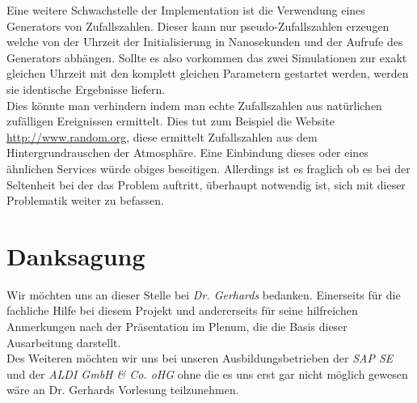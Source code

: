 \documentclass[10pt,twocolumn]{scrartcl}
\begin{document}
Eine weitere Schwachstelle der Implementation ist die Verwendung eines Generators von Zufallszahlen. Dieser kann nur pseudo-Zufallszahlen erzeugen welche von der Uhrzeit der Initialisierung in Nanosekunden und der Aufrufe des Generators abhängen\cite{Oracle:2014}. Sollte es also vorkommen das zwei Simulationen zur exakt gleichen Uhrzeit mit den komplett gleichen Parametern gestartet werden, werden sie identische Ergebnisse liefern.\\
Dies könnte man verhindern indem man echte Zufallszahlen aus natürlichen zufälligen Ereignissen ermittelt. Dies tut zum Beispiel die Website \url{http://www.random.org}, diese ermittelt Zufallszahlen aus dem Hintergrundrauschen der Atmosphäre. Eine Einbindung dieses oder eines ähnlichen Services würde obiges beseitigen. Allerdings ist es fraglich ob es bei der Seltenheit bei der das Problem auftritt, überhaupt notwendig ist, sich mit dieser Problematik weiter zu befassen.



\section*{Danksagung}
Wir möchten uns an dieser Stelle bei \emph{Dr. Gerhards} bedanken. Einerseits für die fachliche Hilfe bei diesem Projekt und andererseits für seine hilfreichen Anmerkungen nach der Präsentation im Plenum, die die Basis dieser Ausarbeitung darstellt.\\
Des Weiteren möchten wir uns bei unseren Ausbildungsbetrieben der \emph{SAP SE} und der \emph{ALDI GmbH \& Co. oHG} ohne die es uns erst gar nicht möglich gewesen wäre an Dr. Gerhards Vorlesung teilzunehmen.
\end{document}
